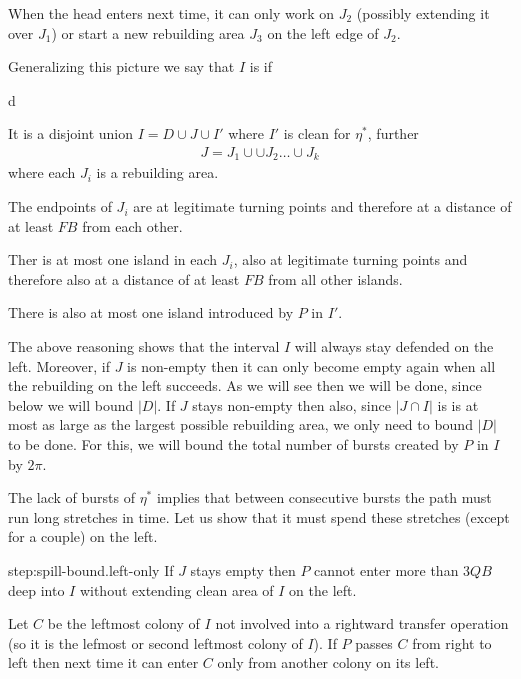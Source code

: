 \documentclass[11pt]{memoir}
\theoremstyle{definition} %
\def\B{B}
\newcommand{\F}{F}
\newcommand{\Q}{Q}
\begin{document}
\begin{Proof}
When the head enters next time, it can only work on \( J_{2} \) (possibly extending it over \( J_{1} \))
or start a new rebuilding area \( J_{3} \) on the left edge of \( J_{2} \).

Generalizing this picture we say that  \( I \) is  if
  \begin{varenum}{d}
  \item  It is a disjoint union \( I=D\cup J\cup I' \) where \( I' \) is clean for \( \eta^{*} \),
    further 
  \begin{align*}
   J= J_{1}\cup \cup  J_{2}\dots\cup J_{k}
  \end{align*}
  where each \( J_{i} \) is a rebuilding area.
\item The endpoints of \( J_{i} \) are at legitimate turning points and therefore at a distance of
  at least \( \F\B \) from each other.
\item  Ther is at most one island in each \( J_{i} \), also at legitimate turning points and therefore  also 
  at a distance of at least \( \F\B \) from all other islands.
  \item\label{i:inside-island} There is also at most one island introduced by \( P \) in \( I' \).
  \end{varenum}

  The above reasoning shows that the interval \( I \) will always stay defended on the left.
  Moreover, if \( J \) is non-empty then it can only become empty again when
  all the rebuilding on the left succeeds.
  As we will see then we will be done, since below we will bound \( |D| \).
  If \( J \) stays non-empty then also, since \( |J\cap I| \) is 
is at most as large as the largest possible rebuilding area,
 we only need to bound \( |D| \) to be done.
 For this, we will bound the total number of bursts created by \( P \) in \( I \) by \( 2\pi \).

 The lack of bursts of \( \eta^{*} \) implies that between consecutive bursts the path must
 run long stretches in time.
 Let us show that it must spend these stretches (except for a couple) on the left. 
 
 \begin{step+}{step:spill-bound.left-only}
   If \( J \) stays empty then \( P \) cannot enter more than \( 3\Q\B \) deep into \( I \)
   without extending clean area of \( I \) on the left.
  \end{step+}
  \begin{pproof}
   Let \( C \) be the leftmost colony of \( I \) not involved into a rightward transfer operation
   (so it is the lefmost or second leftmost colony of \( I \)).
   If  \( P \) passes \( C \) from right to left then next time it can enter \( C \) only from another
   colony on its left.
  \end{pproof} %


\end{Proof}
\end{document}
